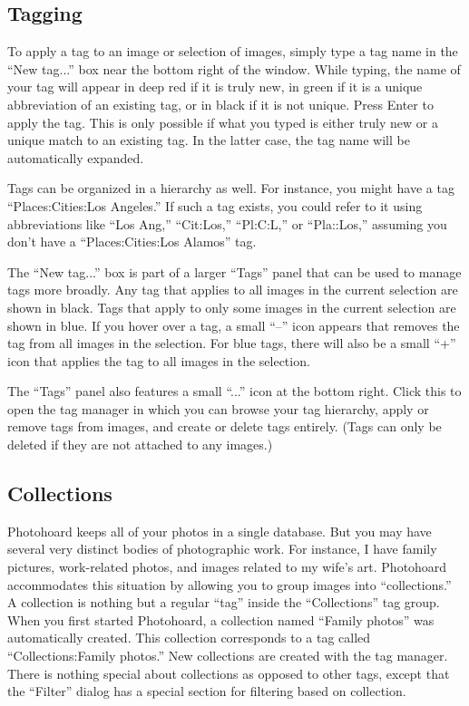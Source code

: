 \documentclass[11pt]{report}
\begin{document}
\subsection{Tagging}

To apply a tag to an image or selection of images, simply type a tag
name in the ``New tag...'' box near the bottom right of the
window. While typing, the name of your tag will appear in deep red if it is
truly new, in green if it is a unique abbreviation of an existing tag,
or in black if it is not unique. Press Enter to apply the tag. This is
only possible if what you typed is either truly new or a unique match to an
existing tag. In the latter case, the tag name will be automatically expanded.

Tags can be organized in a hierarchy as well. For instance, you might
have a tag ``Places:Cities:Los Angeles.'' If such a tag exists, you
could refer to it using abbreviations like ``Los Ang,'' ``Cit:Los,''
``Pl:C:L,'' or ``Pla::Los,'' assuming you don't have a
``Places:Cities:Los Alamos'' tag.

The ``New tag...'' box is part of a larger ``Tags'' panel that
can be used to manage tags more broadly. Any tag that applies to all
images in the current selection are shown in black. Tags that apply to
only some images in the current selection are shown in blue. If you
hover over a tag, a small ``--'' icon appears that removes the tag
from all images in the selection. For blue tags, there will also be a
small ``+'' icon that applies the tag to all images in the selection.

The ``Tags'' panel also features a small ``...'' icon at the bottom
right. Click this to open the tag manager in which you can browse your
tag hierarchy, apply or remove tags from images, and create or delete
tags entirely. (Tags can only be deleted if they are not attached to
any images.)

\subsection{Collections}

Photohoard keeps all of your photos in a single database. But you may
have several very distinct bodies of photographic work. For instance, I have
family pictures, work-related photos, and images related to my wife's
art. Photohoard accommodates this situation by allowing you to group
images into ``collections.'' A collection is nothing but a regular
``tag'' inside the ``Collections'' tag group. When you first started
Photohoard, a collection named ``Family photos'' was automatically
created. This collection corresponds to a tag called
``Collections:Family photos.''  New collections are created with the
tag manager. There is nothing special about collections as opposed to
other tags, except that the ``Filter'' dialog has a special section
for filtering based on collection.
\end{document}
